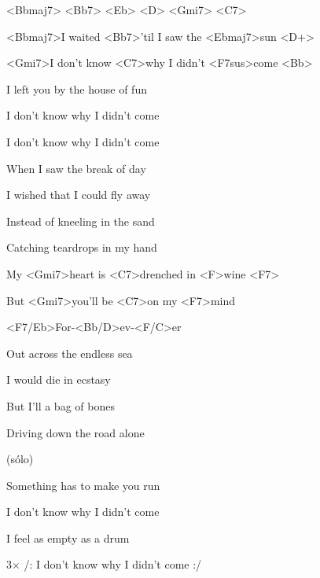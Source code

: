 
<Bbmaj7> <Bb7> <Eb> <D> <Gmi7> <C7>

\zs
<Bbmaj7>I waited <Bb7>'til I saw the <Ebmaj7>sun <D+>

<Gmi7>I don't know <C7>why I didn't <F7sus>come <Bb>

I left you by the house of fun

I don't know why I didn't come

I don't know why I didn't come
\ks

\zs
When I saw the break of day

I wished that I could fly away

Instead of kneeling in the sand

Catching teardrops in my hand
\ks

\zr
My <Gmi7>heart is <C7>drenched in <F>wine <F7>

But <Gmi7>you'll be <C7>on my <F7>mind
 
<F7/Eb>For-<Bb/D>ev-<F/C>er
\kr

\zs
Out across the endless sea

I would die in ecstasy

But I'll a bag of bones

Driving down the road alone
\ks

\zr
\kr

\zs
(sólo)
\ks

\zs
Something has to make you run

I don't know why I didn't come

I feel as empty as a drum

3× /: I don't know why I didn't come :/
\ks

\kp
